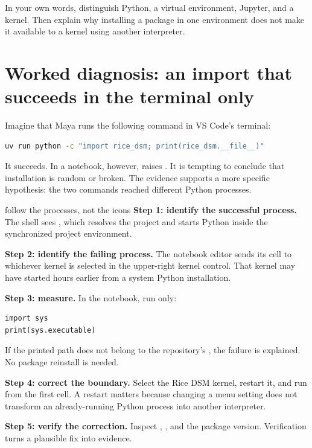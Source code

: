 \begin{checkpointbox}
In your own words, distinguish Python, a virtual environment, Jupyter, and a
kernel. Then explain why installing a package in one environment does not make
it available to a kernel using another interpreter.
\end{checkpointbox}

\section{Worked diagnosis: an import that succeeds in the terminal only}

Imagine that Maya runs the following command in VS Code's terminal:

\begin{lstlisting}[language=bash,numbers=none]
uv run python -c "import rice_dsm; print(rice_dsm.__file__)"
\end{lstlisting}

It succeeds. In a notebook, however,  raises
. It is tempting to conclude that installation is
random or broken. The evidence supports a more specific hypothesis: the two
commands reached different Python processes.

\begin{workedexample}{follow the processes, not the icons}
\textbf{Step 1: identify the successful process.} The shell sees ,
which resolves the project and starts Python inside the synchronized project
environment.

\textbf{Step 2: identify the failing process.} The notebook editor sends its
cell to whichever kernel is selected in the upper-right kernel control. That
kernel may have started hours earlier from a system Python installation.

\textbf{Step 3: measure.} In the notebook, run only:

\begin{lstlisting}
import sys
print(sys.executable)
\end{lstlisting}

If the printed path does not belong to the repository's , the
failure is explained. No package reinstall is needed.

\textbf{Step 4: correct the boundary.} Select the Rice DSM kernel, restart it,
and run from the first cell. A restart matters because changing a menu setting
does not transform an already-running Python process into another interpreter.

\textbf{Step 5: verify the correction.} Inspect ,
, and the package version. Verification turns a
plausible fix into evidence.
\end{workedexample}

